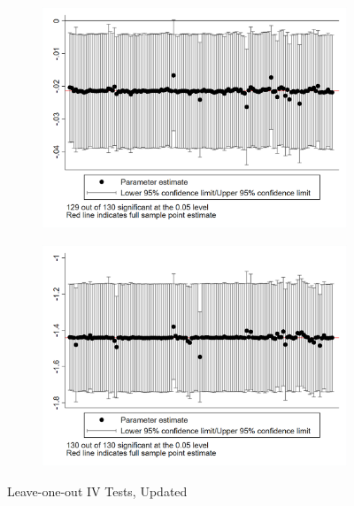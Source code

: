 \documentclass{article}
\begin{document}
\begin{figure}[htbp]
\begin{subfigure}{0.3\textwidth}
        \includegraphics[width=\linewidth]{exhibits/figures/exogeneity_tests/loo_iv_spdist.png}
        \label{fig:sub6}
    \end{subfigure}
    \begin{subfigure}{0.3\textwidth}
        \includegraphics[width=\linewidth]{exhibits/figures/exogeneity_tests/loo_iv_totfrac.png}
        \label{fig:sub4}
    \end{subfigure}
    \caption{Leave-one-out IV Tests, Updated}
    \label{fig:all}
\end{figure}
\end{document}
